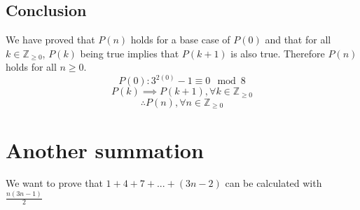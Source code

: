 \documentclass{article}
\begin{document}
\subsection{Conclusion}
We have proved that $P(n)$ holds for a base case of $P(0)$ and that for all $k \in \mathbb Z_{\ge 0}$, $P(k)$ being true implies that $P(k + 1)$ is also true. Therefore $P(n)$ holds for all $n \ge 0$.
\[P(0): 3^{2(0)} - 1 \equiv 0 \mod 8 \]
\[P(k) \implies P(k + 1), \forall k \in \mathbb Z_{\ge 0}\]
\[ \therefore P(n), \forall n \in \mathbb Z_{\ge 0} \]

\section{Another summation}
We want to prove that $ 1 + 4 + 7 + ... + (3n - 2) $ can be calculated with $ \frac{n(3n - 1)}{2} $
\end{document}
